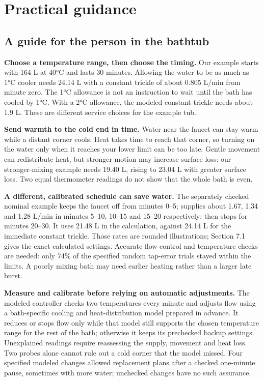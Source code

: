 \documentclass[12pt,a4paper]{article}
\begin{document}
\clearpage
\section{Practical guidance}
\subsection*{A guide for the person in the bathtub}
\textbf{Choose a temperature range, then choose the timing.} Our example starts with 164 L at 40°C and lasts 30 minutes. Allowing the water to be as much as 1°C cooler needs 24.14 L with a constant trickle of about 0.805 L/min from minute zero. The 1°C allowance is not an instruction to wait until the bath has cooled by 1°C. With a 2°C allowance, the modeled constant trickle needs about 1.9 L. These are different service choices for the example tub.

\textbf{Send warmth to the cold end in time.} Water near the faucet can stay warm while a distant corner cools. Heat takes time to reach that corner, so turning on the water only when it reaches your lower limit can be too late. Gentle movement can redistribute heat, but stronger motion may increase surface loss: our stronger-mixing example needs 19.40 L, rising to 23.04 L with greater surface loss. Two equal thermometer readings do not show that the whole bath is even.

\textbf{A different, calibrated schedule can save water.} The separately checked nominal example keeps the faucet off from minutes 0–5; supplies about 1.67, 1.34 and 1.28 L/min in minutes 5–10, 10–15 and 15–20 respectively; then stops for minutes 20–30. It uses 21.48 L in the calculation, against 24.14 L for the immediate constant trickle. Those rates are rounded illustrations; Section 7.1 gives the exact calculated settings. Accurate flow control and temperature checks are needed: only 74\% of the specified random tap-error trials stayed within the limits. A poorly mixing bath may need earlier heating rather than a larger late burst.

\textbf{Measure and calibrate before relying on automatic adjustments.} The modeled controller checks two temperatures every minute and adjusts flow using a bath-specific cooling and heat-distribution model prepared in advance. It reduces or stops flow only while that model still supports the chosen temperature range for the rest of the bath; otherwise it keeps its prechecked backup settings. Unexplained readings require reassessing the supply, movement and heat loss. Two probes alone cannot rule out a cold corner that the model missed. Four specified modeled changes allowed replacement plans after a checked one-minute pause, sometimes with more water; unchecked changes have no such assurance.
\end{document}
